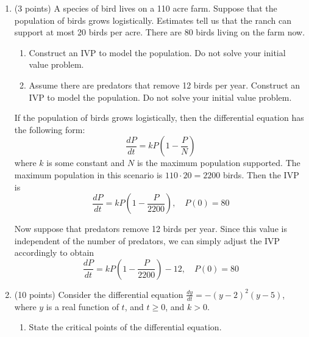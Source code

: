 \documentclass[11pt, titlepage]{article}
\begin{document}
\begin{enumerate}
    \item (3 points) A species of bird lives on a 110 acre farm.
    Suppose that the population of birds grows logistically.
    Estimates tell us that the ranch can support at most 20 birds per acre.
    There are 80 birds living on the farm now.
    \begin{enumerate}[label={(\alph*)}]
      \item Construct an IVP to model the population. Do not solve your initial value problem.

      \item Assume there are predators that remove 12 birds per year.
      Construct an IVP to model the population. Do not solve your initial value problem.
    \end{enumerate}

    \begin{solution}
      If the population of birds grows logistically, then the differential equation has the following form:
      \begin{equation*}
        \frac{dP}{dt} = k P \left( 1 - \frac{P}{N} \right)
      \end{equation*}
      where \(k\) is some constant and \(N\) is the maximum population supported.
      The maximum population in this scenario is \(110 \cdot 20 = 2200\) birds.
      Then the IVP is
      \begin{equation*}
        \frac{dP}{dt} = k P \left(1 - \frac{P}{2200} \right), \quad P(0) = 80
      \end{equation*}

      Now suppose that predators remove 12 birds per year.
      Since this value is independent of the number of predators, we can simply adjust the IVP accordingly to obtain
      \begin{equation*}
        \frac{dP}{dt} = k P \left(1 - \frac{P}{2200} \right) - 12, \quad P(0) = 80
      \end{equation*}
    \end{solution}

    \pagebreak

    \item (10 points) Consider the differential equation \(\frac{dy}{dt} = -(y - 2)^{2} (y - 5)\),
    where \(y\) is a real function of \(t\), and \(t \geq 0\), and \(k > 0\).
    \begin{enumerate}[label={(\alph*)}]
      \item State the critical points of the differential equation.


\end{enumerate}
\end{enumerate}
\end{document}
